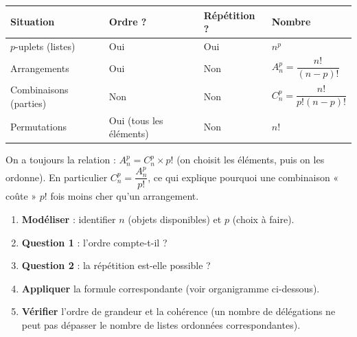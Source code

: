 \documentclass[11pt]{article}
\begin{document}
\begin{aretenir}
\begin{center}
\begin{tabularx}{\linewidth}{|l|X|X|X|}
\hline
\rowcolor{popblueL} \textbf{Situation} & \textbf{Ordre ?} & \textbf{Répétition ?} & \textbf{Nombre} \\
\hline
$p$-uplets (listes) & Oui & Oui & $n^p$ \\
\hline
Arrangements & Oui & Non & $A_n^p = \dfrac{n!}{(n-p)!}$ \\
\hline
Combinaisons (parties) & Non & Non & $C_n^p = \dfrac{n!}{p!(n-p)!}$ \\
\hline
Permutations & Oui (tous les éléments) & Non & $n!$ \\
\hline
\end{tabularx}
\end{center}
On a toujours la relation : $A_n^p = C_n^p \times p!$ (on choisit les éléments, puis on les ordonne). En particulier $C_n^p = \dfrac{A_n^p}{p!}$, ce qui explique pourquoi une combinaison « coûte » $p!$ fois moins cher qu'un arrangement.
\end{aretenir}

\begin{methode}
\begin{enumerate}
\item \textbf{Modéliser} : identifier $n$ (objets disponibles) et $p$ (choix à faire).
\item \textbf{Question 1} : l'ordre compte-t-il ?
\item \textbf{Question 2} : la répétition est-elle possible ?
\item \textbf{Appliquer} la formule correspondante (voir organigramme ci-dessous).
\item \textbf{Vérifier} l'ordre de grandeur et la cohérence (un nombre de délégations ne peut pas dépasser le nombre de listes ordonnées correspondantes).
\end{enumerate}
\end{methode}
\end{document}
